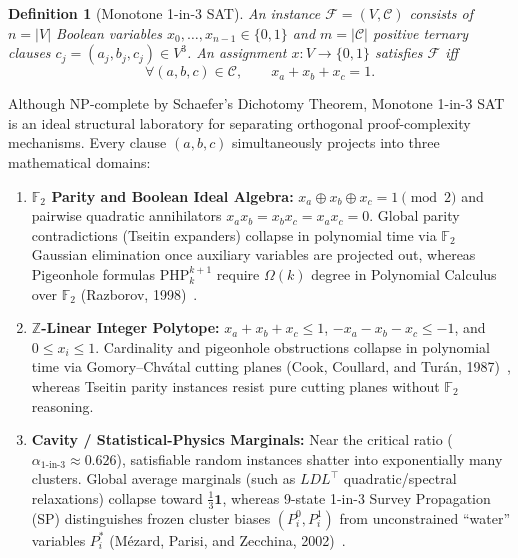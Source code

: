 \documentclass[11pt]{article}
\newtheorem{definition}{Definition}
\begin{document}
\begin{definition}[Monotone 1-in-3 SAT]
An instance $\mathcal{F} = (V, \mathcal{C})$ consists of $n = |V|$ Boolean variables $x_0, \dots, x_{n-1} \in \{0, 1\}$ and $m = |\mathcal{C}|$ positive ternary clauses $c_j = (a_j, b_j, c_j) \in V^3$. An assignment $x : V \to \{0, 1\}$ satisfies $\mathcal{F}$ iff
\[
\forall (a, b, c) \in \mathcal{C}, \qquad x_a + x_b + x_c = 1.
\]
\end{definition}

Although NP-complete by Schaefer's Dichotomy Theorem, Monotone 1-in-3 SAT is an ideal structural laboratory for separating orthogonal proof-complexity mechanisms. Every clause $(a, b, c)$ simultaneously projects into three mathematical domains:
\begin{enumerate}
  \item \textbf{$\mathbb{F}_2$ Parity and Boolean Ideal Algebra:} $x_a \oplus x_b \oplus x_c = 1 \pmod{2}$ and pairwise quadratic annihilators $x_a x_b = x_b x_c = x_a x_c = 0$. Global parity contradictions (Tseitin expanders) collapse in polynomial time via $\mathbb{F}_2$ Gaussian elimination once auxiliary variables are projected out, whereas Pigeonhole formulas $\mathrm{PHP}_k^{k+1}$ require $\Omega(k)$ degree in Polynomial Calculus over $\mathbb{F}_2$ (Razborov, 1998)~\cite{razborov1998}.
  \item \textbf{$\mathbb{Z}$-Linear Integer Polytope:} $x_a + x_b + x_c \le 1$, $-x_a - x_b - x_c \le -1$, and $0 \le x_i \le 1$. Cardinality and pigeonhole obstructions collapse in polynomial time via Gomory--Chv\'atal cutting planes (Cook, Coullard, and Tur\'an, 1987)~\cite{cook1987}, whereas Tseitin parity instances resist pure cutting planes without $\mathbb{F}_2$ reasoning.
  \item \textbf{Cavity / Statistical-Physics Marginals:} Near the critical ratio ($\alpha_{\text{1-in-3}} \approx 0.626$), satisfiable random instances shatter into exponentially many clusters. Global average marginals (such as $LDL^\top$ quadratic/spectral relaxations) collapse toward $\frac{1}{3}\mathbf{1}$, whereas 9-state 1-in-3 Survey Propagation (SP) distinguishes frozen cluster biases $(P_i^0, P_i^1)$ from unconstrained ``water'' variables $P_i^*$ (M\'ezard, Parisi, and Zecchina, 2002)~\cite{mezard2002}.
\end{enumerate}
\end{document}
